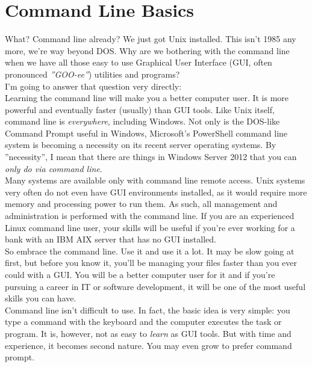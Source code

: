 \chapter{Command Line Basics}

What?  Command line already?  We just got Unix installed.  This isn't 1985 any more, we're way beyond DOS.  Why are we bothering with the command line when we have all those easy to use Graphical User Interface (GUI, often pronounced \textit{''GOO-ee''}) utilities and programs?\\

I'm going to answer that question very directly:\\

Learning the command line will make you a better computer user.  It is more powerful and eventually faster (usually) than GUI tools.  Like Unix itself, command line is \textit{everywhere}, including Windows.  Not only is the DOS-like Command Prompt useful in Windows, Microsoft's PowerShell command line system is becoming a necessity on its recent server operating systems.  By ''necessity'', I mean that there are things in Windows Server 2012 that you can \textit{only do via command line}.\\

Many systems are available only with command line remote access.  Unix systems very often do not even have GUI environments installed, as it would require more memory and processing power to run them.  As such, all management and administration is performed with the command line.  If you are an experienced Linux command line user, your skills will be useful if you're ever working for a bank with an IBM AIX server that has no GUI installed.\\

So embrace the command line.  Use it and use it a lot.  It may be slow going at first, but before you know it, you'll be managing your files faster than you ever could with a GUI.  You will be a better computer user for it and if you're pursuing a career in IT or software development, it will be one of the most useful skills you can have.\\

Command line isn't difficult to use.  In fact, the basic idea is very simple: you type a command with the keyboard and the computer executes the task or program.  It is, however, not as easy to \textit{learn} as GUI tools.  But with time and experience, it becomes second nature.  You may even grow to prefer command prompt.\\

